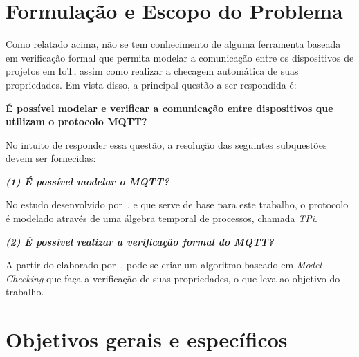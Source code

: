 \section{Formulação e Escopo do Problema}

Como relatado acima, não se tem conhecimento de alguma ferramenta baseada em verificação formal que permita modelar a comunicação entre os dispositivos de projetos em IoT, assim como realizar a checagem automática de suas propriedades. Em vista disso, a principal questão a ser respondida é:

\textbf{É possível modelar e verificar a comunicação entre dispositivos que utilizam o protocolo MQTT?}

No intuito de responder essa questão, a resolução das seguintes subquestões devem ser fornecidas:

\textbf{\textit{(1) É possível modelar o MQTT?}}


No estudo desenvolvido por~\citeauthor{aziz2016formal}, e que serve de base para este trabalho, o protocolo é modelado através de uma álgebra temporal de processos, chamada \textit{TPi}.

\textbf{\textit{(2) É possível realizar a verificação formal do MQTT?}}

A partir do elaborado por~\citeauthor{aziz2016formal}, pode-se criar um algoritmo baseado em \textit{Model Checking} que faça a verificação de suas propriedades, o que leva ao objetivo do trabalho.

\section{Objetivos gerais e específicos}

